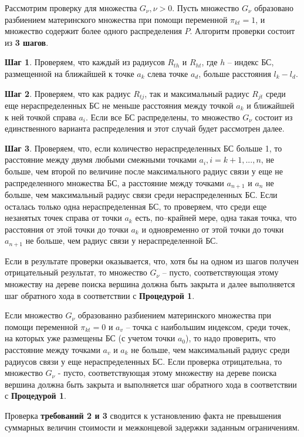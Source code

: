 Рассмотрим проверку для  множества  $G_\nu, \nu>0$. Пусть множество $G_\nu$  образовано разбиением материнского множества при помощи переменной $\pi_{kt}=1$, и множество содержит более одного распределения $P$.
Алгоритм проверки состоит из \textbf{3 шагов}.

\textbf{Шаг 1}. Проверяем, что каждый из радиусов $R_{th}$ и $R_{ht}$, где $h$ – индекс БС, размещенной на ближайшей к точке $a_k$ слева точке $a_d$, больше расстояния $l_k-l_d$. 

\textbf{Шаг 2}. Проверяем, что как радиус $R_{tj}$, так и максимальный радиус $R_{jt}$ среди еще нераспределенных БС не меньше расстояния между точкой $a_k$ и ближайшей к ней точкой справа $a_i$.  Если все БС распределены, то множество $G_\nu$ состоит из единственного варианта распределения и этот случай будет рассмотрен далее.

\textbf{Шаг 3}. Проверяем, что, если количество нераспределенных БС больше 1, то расстояние между двумя любыми смежными точками $a_i, i=k+1,...,n$, не больше, чем второй по величине после максимального радиус связи у еще не распределенного множества БС, а расстояние между точками $a_{n+1}$ и $a_n$  не больше, чем максимальный радиус связи среди нераспределенных БС. Если осталась только одна нераспределенная БС, то проверяем, что среди еще незанятых точек справа от точки $a_k$  есть, по–крайней мере, одна такая точка, что расстояния от этой точки до точки $a_k$ и одновременно от этой точки до точки $a_{n+1}$ не больше, чем  радиус связи у нераспределенной БС.

Если в результате проверки оказывается, что, хотя бы на одном из шагов получен отрицательный результат, то множество $G_\nu$ -- пусто, соответствующая этому множеству на дереве поиска вершина должна быть закрыта и далее выполняется шаг обратного хода в соответствии с \textbf{Процедурой 1}.

Если множество $G_\nu$ образованно разбиением материнского множества при помощи переменной $\pi_{kt}=0$ и $a_v$ -- точка с наибольшим индексом, среди точек, на которых уже размещены БС (с учетом точки $a_0$), то надо проверить, что расстояние между точками $a_v$ и $a_k$ не больше, чем максимальный радиус среди радиусов связи у еще нераспределенных БС. Если проверка отрицательна, то множество $G_\nu$  - пусто, соответствующая этому множеству на дереве поиска вершина должна быть закрыта и выполняется шаг обратного хода в соответствии с \textbf{Процедурой 1}.

Проверка \textbf{требований 2 и 3} сводится к установлению факта не превышения суммарных величин стоимости и межконцевой задержки заданным ограничениям.

